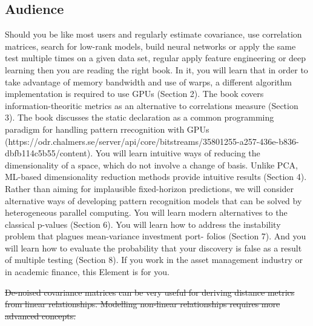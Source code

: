 \documentclass[10pt]{article}[draft]
\begin{document}
		
\subsection{Audience}

Should you be like most users and  regularly estimate covariance, use correlation matrices, search for low-rank models, build neural networks or apply the same test multiple times on a given data set, regular apply feature engineering or deep learning then you are reading the right book. In it, you will learn that in order to take advantage of memory bandwidth  and use of warps, a different algorithm implementation is required to use GPUs  (Section 2). The book covers information-theoritic metrics as an alternative to  correlations measure (Section 3). The book discusses the static declaration as a common programming paradigm for handling pattern rrecognition with GPUs (https://odr.chalmers.se/server/api/core/bitstreams/35801255-a257-436e-b836-dbfb114c5b55/content). You will learn intuitive ways of reducing the dimensionality of a space, which do not involve a change of basis. Unlike PCA, ML-based dimensionality reduction methods provide intuitive results (Section 4). Rather than aiming for implausible fixed-horizon predictions, we will consider alternative ways of developing pattern recognition models that can be solved by heterogeneous parallel computing. You will learn modern alternatives to the classical p-values (Section 6). You will learn how to address the instability problem that plagues mean-variance investment port- folios (Section 7). And you will learn how to evaluate the probability that your discovery is false as a result of multiple testing (Section 8). If you work in the asset management industry or in academic finance, this Element is for you.


		\st{De-noised covariance matrices can be very useful for deriving distance metrics from linear relationships. Modelling non-linear relationships requires more advanced concepts. }
		
\end{document}
